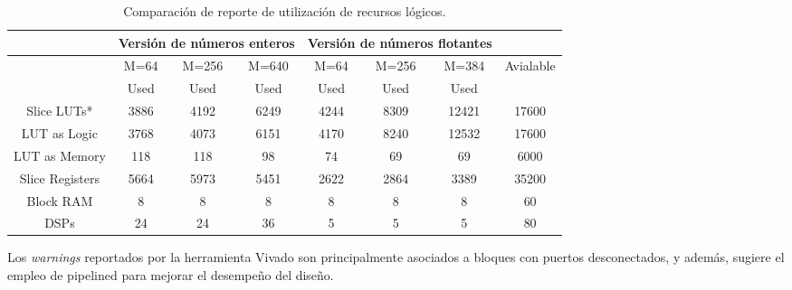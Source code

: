 \documentclass[conference]{IEEEtran}
\begin{document}
\begin{table*}[]
\centering
\caption{Comparación de reporte de  utilización de recursos lógicos.}
\label{tab:my-table2}
\begin{tabular}{cccccccc}

\multicolumn{1}{l}{} & \multicolumn{3}{l}{Versión de números enteros} & \multicolumn{3}{l}{Versión de números flotantes} & \multicolumn{1}{l}{} \\ \hline
                & M=64 & M=256 & M=640 & M=64 & M=256 & M=384 & Avialable \\ \hline
                & Used & Used  & Used  & Used & Used  & Used  &           \\ \hline
Slice LUTs*     & 3886 & 4192  & 6249  & 4244 & 8309  &  12421      & 17600     \\ \hline
LUT as Logic    & 3768 & 4073  & 6151  & 4170 & 8240  &  12532     & 17600     \\ \hline
LUT as Memory   & 118  & 118   & 98    & 74   & 69    &    69   & 6000      \\ \hline
Slice Registers & 5664 & 5973  & 5451  & 2622 &  2864 &  3389     & 35200     \\ \hline
Block RAM       & 8    & 8     & 8     &  8   &  8    &   8    & 60        \\ \hline
DSPs            & 24   & 24    & 36    &  5   &  5    &    5   & 80        \\ \hline

\end{tabular}

\end{table*}
Los \textit{warnings} reportados por la herramienta Vivado son principalmente asociados a bloques con puertos desconectados, y además, sugiere el empleo de pipelined para mejorar el desempeño del diseño.
\end{document}
